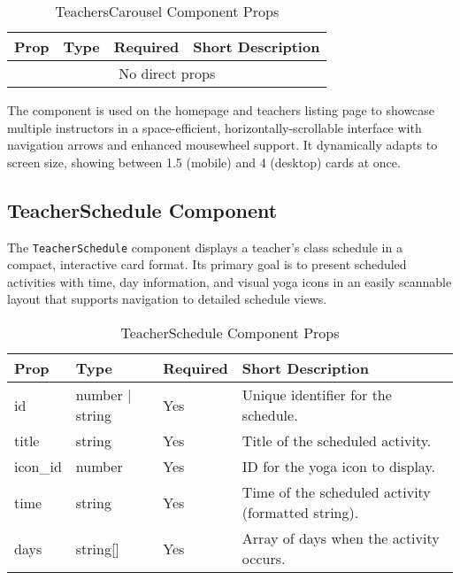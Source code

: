 \begin{table}[H]
    \centering
    \setlength{\tabcolsep}{5pt}
    \renewcommand{\arraystretch}{1.2}
    \begin{tabular}{|p{2.2cm}|p{3.6cm}|p{1.5cm}|p{6cm}|}
        \hline
        \rowcolor{bluepoli!20}
        \textbf{Prop} & \textbf{Type} & \textbf{Required} & \textbf{Short Description} \\
        \hline
        \multicolumn{4}{|c|}{No direct props} \\
        \hline
    \end{tabular}
    \caption{TeachersCarousel Component Props}
\end{table}

The component is used on the homepage and teachers listing page to showcase multiple instructors in a space-efficient, horizontally-scrollable interface with navigation arrows and enhanced mousewheel support. It dynamically adapts to screen size, showing between 1.5 (mobile) and 4 (desktop) cards at once.

\subsection{TeacherSchedule Component}
The \texttt{TeacherSchedule} component displays a teacher's class schedule in a compact, interactive card format. Its primary goal is to present scheduled activities with time, day information, and visual yoga icons in an easily scannable layout that supports navigation to detailed schedule views.

\begin{table}[H]
    \centering
    \setlength{\tabcolsep}{5pt}
    \renewcommand{\arraystretch}{1.2}
    \begin{tabular}{|p{2.2cm}|p{3.6cm}|p{1.5cm}|p{6cm}|}
        \hline
        \rowcolor{bluepoli!20}
        \textbf{Prop} & \textbf{Type} & \textbf{Required} & \textbf{Short Description} \\
        \hline
        id & number | string & Yes & Unique identifier for the schedule. \\
        \hline
        title & string & Yes & Title of the scheduled activity. \\
        \hline
        icon\_id & number & Yes & ID for the yoga icon to display. \\
        \hline
        time & string & Yes & Time of the scheduled activity (formatted string). \\
        \hline
        days & string[] & Yes & Array of days when the activity occurs. \\
        \hline
    \end{tabular}
    \caption{TeacherSchedule Component Props}
\end{table}

